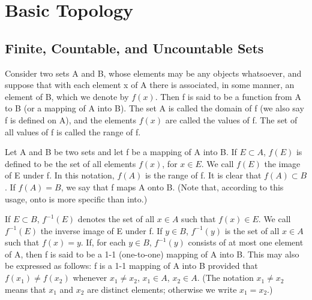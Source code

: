
\chapter{Basic Topology}
\label{chap:rudin2}

\section{Finite, Countable, and Uncountable Sets}
\label{sec:chap2:countability}


\begin{definition} %
  \label{def:chap2:function}
  Consider two sets A and B, whose elements may be any objects
  whatsoever, and suppose that with each element x of A there is
  associated, in some manner, an element of B, which we denote by
  $f(x)$. Then f is said to be a function from A to B (or a mapping
  of A into B). The set A is called the domain of f (we also say f is
  defined on A), and the elements $f(x)$ are called the values of f.
  The set of all values of f is called the range of f.
\end{definition}

\begin{definition} %
  \label{def:chap2:image_inverse_onto_1-1}
  Let A and B be two sets and let f be a mapping of A into B.
  If $E \subset A$, $f(E)$ is defined to be the set of all elements
  $f(x)$, for $x \in E$. We call $f(E)$ the image of E under f. In
  this notation, $f(A)$ is the range of f. It is clear that $f(A)
  \subset B$. If $f(A) = B$, we say that f maps A onto B. (Note that,
  according to this usage, onto is more specific than into.)

  If $E \subset B$, $f^{-1}(E)$ denotes the set of all $x \in A$ such
  that $f(x) \in E$. We call $f^{-1}(E)$ the inverse image of E under
  f. If $y \in B$, $f^{-1}(y)$ is the set of all $x \in A$ such that
  $f(x)=y$. If, for each $y \in B$, $f^{-1}(y)$ consists of at most
  one element of A, then f is said to be a 1-1 (one-to-one) mapping
  of A into B. This may also be expressed as follows: f is a 1-1
  mapping of A into B provided that $f(x_1) \ne f(x_2)$ whenever $x_1
  \ne x_2$, $x_1 \in A$, $x_2 \in A$.
  (The notation $x_1 \ne x_2$ means that $x_1$ and $x_2$ are distinct
  elements; otherwise we write $x_1 = x_2$.)
\end{definition}

